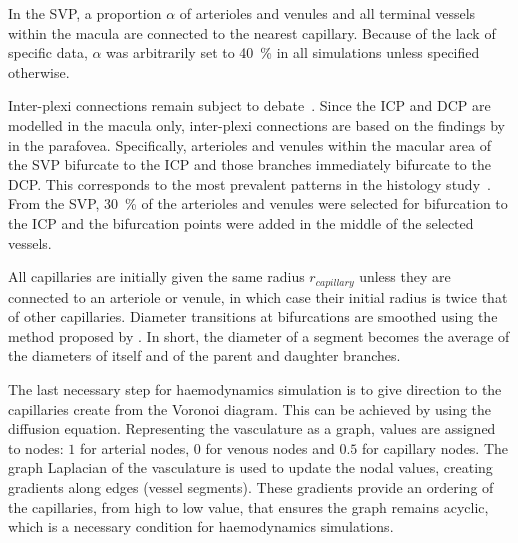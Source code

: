 \documentclass[11pt,]{article}
\begin{document}
In the SVP, a proportion $\alpha$ of arterioles and venules and all terminal vessels within the macula are connected to the nearest capillary. Because of the lack of specific data, $\alpha$ was arbitrarily set to \SI{40}{\percent} in all simulations unless specified otherwise.

Inter-plexi connections remain subject to debate~\cite{An2020,Chiaravalli2022,Campbell2017}.
Since the ICP and DCP are modelled in the macula only, inter-plexi connections are based on the findings by \citet{An2020} in the parafovea.
Specifically, arterioles and venules within the macular area of the SVP bifurcate to the ICP and those branches immediately bifurcate to the DCP.
This corresponds to the most prevalent patterns in the histology study~\cite{An2020}.
From the SVP, \SI{30}{\percent} of the arterioles and venules were selected for bifurcation to the ICP and the bifurcation points were added in the middle of the selected vessels.

All capillaries are initially given the same radius $r_{capillary}$ unless they are connected to an arteriole or venule, in which case their initial radius is twice that of other capillaries.
Diameter transitions at bifurcations are smoothed using the method proposed by \citet{Linninger2013}.
In short, the diameter of a segment becomes the average of the diameters of itself and of the parent and daughter branches.

The last necessary step for haemodynamics simulation is to give direction to the capillaries create from the Voronoi diagram.
This can be achieved by using the diffusion equation.
Representing the vasculature as a graph, values are assigned to nodes: $1$ for arterial nodes, $0$ for venous nodes and $0.5$ for capillary nodes.
The graph Laplacian of the vasculature is used to update the nodal values, creating gradients along edges (vessel segments).
These gradients provide an ordering of the capillaries, from high to low value, that ensures the graph remains acyclic, which is a necessary condition for haemodynamics simulations.
\end{document}
